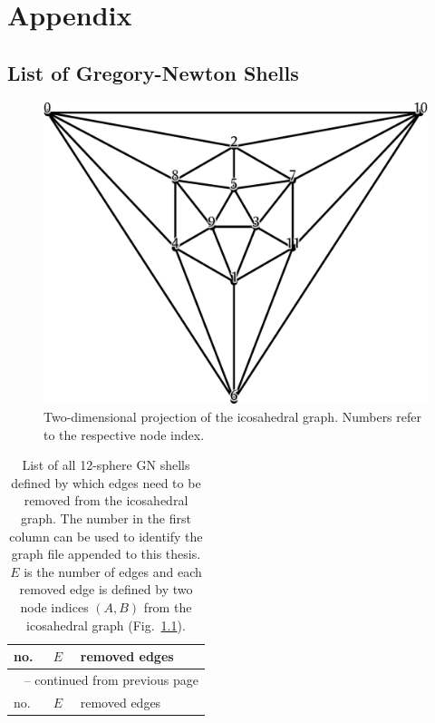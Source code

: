 
\part{Appendix}
\label{sec:appendix}

\begin{appendix}

\chapter{List of Gregory-Newton Shells}
\label{sec:listofgregorynewtonshells}

\begin{figure}[h]\centering
\includegraphics[width=.8\textwidth]{gregory-newton/ico.pdf}
    \caption{Two-dimensional projection of the icosahedral graph. Numbers refer
        to the respective node index.}
    \label{fig:icographappendix}
\end{figure}

\footnotesize{\begin{longtable}{lll}
    \caption{List of all 12-sphere \acs{GN} shells defined by which edges need
    to be removed from the icosahedral graph. The number in the first column
    can be used to identify the graph file appended to this thesis. $E$ is the
    number of edges and each removed edge is defined by two node indices
    $(A,B)$ from the icosahedral graph (Fig.~\ref{fig:icographappendix}).}
    \label{tab:icosubgraphs}\\

\toprule no.  & $E$  &  removed edges \\\midrule\endfirsthead

\multicolumn{3}{c}{\tablename~\thetable{} -- continued from previous page}\\
\toprule no.  & $E$  &  removed edges \\\midrule
\endhead


\end{longtable}}
\end{appendix}
